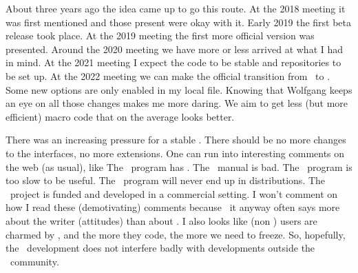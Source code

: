 

\startdocument
  [title={LUAMETATEX},
   banner={where do we stand},
   location={context\enspace {\bf 2020}\enspace meeting}]

\starttitle[title=When it started]

\startitemize

\startitem
    About three years ago the idea came up to go this route.
\stopitem
\startitem
    At the 2018 meeting it was first mentioned and those present were okay with
    it.
\stopitem
\startitem
    Early 2019 the first beta release took place.
\stopitem
\startitem
    At the 2019 meeting the first more official version was presented.
\stopitem
\startitem
    Around the 2020 meeting we have more or less arrived at what I had in mind.
\stopitem
\startitem
    At the 2021 meeting I expect the code to be stable and repositories to be set
    up.
\stopitem
\startitem
    At the 2022 meeting we can make the official transition from \MKIV\ to \LMTX.
\stopitem
\startitem
    Some new options are only enabled in my local  file.
\stopitem
\startitem
    Knowing that Wolfgang keeps an eye on all those changes makes me more daring.
\stopitem
\startitem
    We aim to get less (but more efficient) macro code that on the average looks
    better.
\stopitem

\stopitemize

\stoptitle

\starttitle[title=Why it started]

\startitemize

\startitem
    There was an increasing pressure for a stable \LUATEX.
\stopitem
\startitem
    There should be no more changes to the interfaces, no more extensions.
\stopitem
\startitem
    One can run into interesting comments on the web (as usual), like
    \startitemize[packed]
        \startitem The \LUATEX\ program has . \stopitem
        \startitem The \LUATEX\ manual is bad. \stopitem
        \startitem The \LUATEX\ program is too slow to be useful. \stopitem
        \startitem The \LUATEX\ program will never end up in distributions. \stopitem
        \startitem The \LUATEX\ project is funded and developed in a commercial setting. \stopitem
    \stopitemize
\stopitem
\startitem
    I won't comment on how I read these (demotivating) comments because \unknown
\stopitem
\startitem
    \unknown\ it anyway often says more about the writer (attitudes) than about
    \LUATEX.
\stopitem
\startitem
    I also looks like (non \CONTEXT) users are charmed by \LUATEX, and the more
    they code, the more we need to freeze.
\stopitem
\startitem
    So, hopefully, the \LUAMETATEX\ development does not interfere badly with
    developments outside the \CONTEXT\ community.
\stopitem

